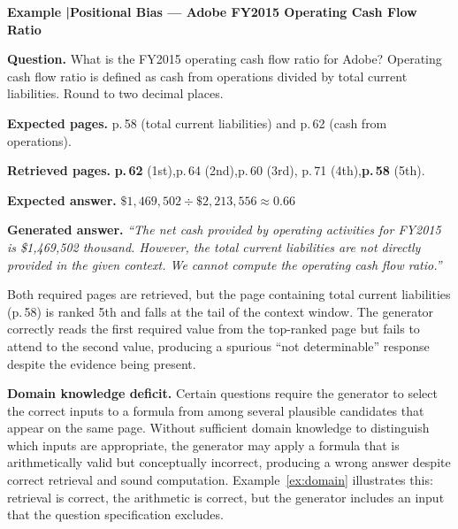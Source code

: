 \documentclass[12pt,twoside,maitrise]{dms}
\theoremstyle{definition}
\numberwithin{equation}{section}
\numberwithin{table}{chapter}
\numberwithin{figure}{chapter}
\newcounter{failex}
\newenvironment{failex}[1]{%
  \refstepcounter{failex}%
  \begin{mdframed}[
    linewidth=0.8pt,
    linecolor=black,
    innertopmargin=10pt,
    innerbottommargin=10pt,
    innerleftmargin=14pt,
    innerrightmargin=14pt,
    skipabove=\baselineskip,
    skipbelow=\baselineskip,
  ]
  \noindent\textbf{Example \thefailex\enspace|\enspace #1}
  \par\medskip
}{%
  \end{mdframed}%
}
\begin{document}
\begin{failex}{Positional Bias --- Adobe FY2015 Operating Cash Flow Ratio}
\label{ex:positional}

\noindent\textbf{Question.}\enspace
What is the FY2015 operating cash flow ratio for Adobe? Operating cash flow ratio is
defined as cash from operations divided by total current liabilities. Round to two
decimal places.

\medskip
\noindent\textbf{Expected pages.}\enspace
p.\,58 (total current liabilities) and p.\,62 (cash from operations).

\noindent\textbf{Retrieved pages.}\enspace
\textbf{p.\,62} (1st),\enspace p.\,64 (2nd),\enspace p.\,60 (3rd),\enspace
p.\,71 (4th),\enspace \textbf{p.\,58} (5th).

\medskip
\noindent\textbf{Expected answer.}\enspace
$\$1{,}469{,}502 \div \$2{,}213{,}556 \approx \mathbf{0.66}$

\medskip
\noindent\textbf{Generated answer.}\enspace
\textit{``The net cash provided by operating activities for FY2015 is \$1,469,502
thousand. However, the total current liabilities are not directly provided in the given
context. We cannot compute the operating cash flow ratio.''}

\end{failex}
\vspace{1em}

Both required pages are retrieved, but the page containing total current liabilities
(p.\,58) is ranked 5th and falls at the tail of the context window. The generator
correctly reads the first required value from the top-ranked page but fails to attend
to the second value, producing a spurious ``not determinable'' response despite the
evidence being present.

\textbf{Domain knowledge deficit.}
Certain questions require the generator to select the correct inputs to a formula from
among several plausible candidates that appear on the same page. Without sufficient
domain knowledge to distinguish which inputs are appropriate, the generator may apply a
formula that is arithmetically valid but conceptually incorrect, producing a wrong answer
despite correct retrieval and sound computation. Example~\ref{ex:domain} illustrates
this: retrieval is correct, the arithmetic is correct, but the generator includes an
input that the question specification excludes.
\end{document}
